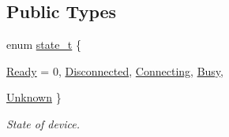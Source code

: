 \subsection*{Public Types}
\begin{DoxyCompactItemize}
\item 
enum \hyperlink{classmdt_device_a39c301b1fda803dba0c9ab98164a9d1e}{state\_\-t} \{ \par
\hyperlink{classmdt_device_a39c301b1fda803dba0c9ab98164a9d1ea577f509c27c399a211c5dc18c0235b69}{Ready} =  0, 
\hyperlink{classmdt_device_a39c301b1fda803dba0c9ab98164a9d1eae06fa1b4e5872df7470aeed0878a2947}{Disconnected}, 
\hyperlink{classmdt_device_a39c301b1fda803dba0c9ab98164a9d1ead8adc8658ebaa24f7525fe18558de4c1}{Connecting}, 
\hyperlink{classmdt_device_a39c301b1fda803dba0c9ab98164a9d1ea4a064f3dc9a486991b3ec09127b1c42a}{Busy}, 
\par
\hyperlink{classmdt_device_a39c301b1fda803dba0c9ab98164a9d1ea9e9410b52d18a2c4da60748530709f09}{Unknown}
 \}
\begin{DoxyCompactList}\small\item\em State of device. \end{DoxyCompactList}\end{DoxyCompactItemize}
